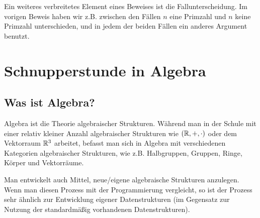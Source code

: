 \begin{bem}
	Ein weiteres verbreitetes Element eines Beweises ist die Fallunterscheidung. Im vorigen Beweis haben wir z.B. zwischen den Fällen $n$ eine Primzahl und $n$ keine Primzahl unterschieden, und in  jedem der beiden Fällen ein anderes Argument benutzt. 
\end{bem} 


\section{Schnupperstunde in Algebra} 

\subsection{Was ist Algebra?}

\begin{bem}
	Algebra ist die Theorie algebraischer Strukturen. Während man in der Schule mit einer relativ kleiner Anzahl algebraischer Strukturen wie $(\mathbb{R},+,\cdot)$ oder dem Vektorraum $\mathbb{R}^3$ arbeitet, befasst man sich in Algebra mit verschiedenen Kategorien algebraischer Strukturen, wie z.B. Halbgruppen, Gruppen, Ringe, Körper und Vektorräume. 

Man entwickelt auch Mittel,  neue/eigene algebraische Strukturen anzulegen. Wenn man diesen Prozess mit der Programmierung vergleicht, so ist der Prozess sehr ähnlich zur Entwicklung eigener Datenstrukturen (im Gegensatz zur Nutzung der standardmäßig vorhandenen Datenstrukturen). 
\end{bem} 

